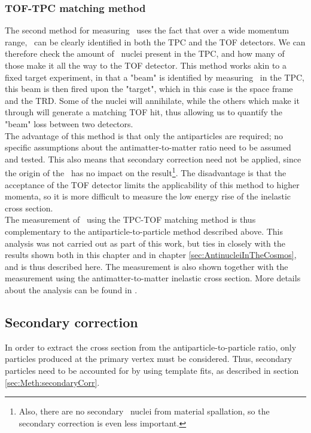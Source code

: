 \subsubsection{TOF-TPC matching method}\label{sec:TOFTPCMethod}
The second method for measuring \sigmainel\ uses the fact that over a wide momentum range, \ahe\ can be clearly identified in both the TPC and the TOF detectors. We can therefore check the amount of \ahe\ nuclei present in the TPC, and how many of those make it all the way to the TOF detector. This method works akin to a fixed target experiment, in that a "beam" is identified by measuring \ahe\ in the TPC, this beam is then fired upon the "target", which in this case is the space frame and the TRD. Some of the nuclei will annihilate, while the others which make it through will generate a matching TOF hit, thus allowing us to quantify the "beam" loss between two detectors. \\
The advantage of this method is that only the antiparticles are required; no specific assumptions about the antimatter-to-matter ratio need to be assumed and tested. This also means that secondary correction need not be applied, since the origin of the \ahe\ has no impact on the result\footnote{Also, there are no secondary \ahe\ nuclei from material spallation, so the secondary correction is even less important.}. The disadvantage is that the acceptance of the TOF detector limits the applicability of this method to higher momenta, so it is more difficult to measure the low energy rise of the inelastic cross section. \\

The measurement of \sigmainel\ using the TPC-TOF matching method is thus complementary to the antiparticle-to-particle method described above. This analysis was not carried out as part of this work, but ties in closely with the results shown both in this chapter and in chapter \ref{sec:AntinucleiInTheCosmos}, and is thus described here. The measurement is also shown together with the measurement using the antimatter-to-matter inelastic cross section. More details about the analysis can be found in \cite{PavelAN, antiHe3XS}.

\subsection{Secondary correction}
In order to extract the cross section from the antiparticle-to-particle ratio, only particles produced at the primary vertex must be considered. Thus, secondary particles need to be accounted for by using template fits, as described in section \ref{sec:Meth:secondaryCorr}. \\

